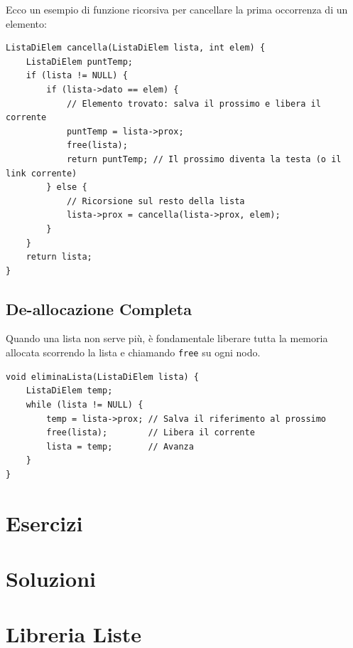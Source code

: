 \documentclass[oneside]{scrbook}
\begin{document}
Ecco un esempio di funzione ricorsiva per cancellare la prima occorrenza di un elemento:

\begin{lstlisting}[style=cstyle]
ListaDiElem cancella(ListaDiElem lista, int elem) {
    ListaDiElem puntTemp;
    if (lista != NULL) {
        if (lista->dato == elem) {
            // Elemento trovato: salva il prossimo e libera il corrente
            puntTemp = lista->prox;
            free(lista);
            return puntTemp; // Il prossimo diventa la testa (o il link corrente)
        } else {
            // Ricorsione sul resto della lista
            lista->prox = cancella(lista->prox, elem);
        }
    }
    return lista;
}
\end{lstlisting}

\subsection{De-allocazione Completa}
Quando una lista non serve più, è fondamentale liberare tutta la memoria allocata scorrendo la lista e chiamando \texttt{free} su ogni nodo.

\begin{lstlisting}[style=cstyle]
void eliminaLista(ListaDiElem lista) {
    ListaDiElem temp;
    while (lista != NULL) {
        temp = lista->prox; // Salva il riferimento al prossimo
        free(lista);        // Libera il corrente
        lista = temp;       // Avanza
    }
}
\end{lstlisting}

\section{Esercizi}













\clearpage


\clearpage
\section*{Soluzioni}
\shipoutAnswer

\clearpage
\section*{Libreria Liste}

\end{document}
